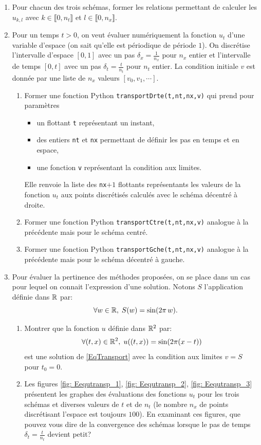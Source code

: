 \begin{enumerate}
 \item Pour chacun des trois schémas, former les relations permettant de calculer les $u_{k,l}$ avec $k\in \llbracket 0, n_t \rrbracket$ et $l\in \llbracket 0, n_x \rrbracket$.
 \item Pour un temps $t>0$, on veut évaluer numériquement la fonction $u_t$ d'une variable d'espace (on sait qu'elle est périodique de période $1$). On discrétise l'intervalle d'espace $[0,1]$ avec un pas $\delta_x = \frac{1}{n_x}$ pour $n_x$ entier et l'intervalle de temps $[0,t]$ avec un pas $\delta_t = \frac{t}{n_t}$ pour $n_t$ entier.\newline
 La condition initiale $v$ est donnée par une liste de $n_x$ valeurs $[v_0,v_1,\cdots ]$.
 \begin{enumerate}
  \item Former une fonction Python \texttt{transportDrte(t,nt,nx,v)} qui prend pour paramètres 
  \begin{itemize}
    \item un flottant \texttt{t} représentant un instant,
    \item des entiers \texttt{nt} et \texttt{nx} permettant de définir les pas en temps et en espace,
    \item une fonction \texttt{v} représentant la condition aux limites.
  \end{itemize}
Elle renvoie la liste des \texttt{nx}$+1$ flottants représentants les valeurs de la fonction $u_t$ aux points discrétisés calculés avec le schéma décentré à droite.

  \item Former une fonction Python \texttt{transportCtre(t,nt,nx,v)} analogue à la précédente mais pour le schéma centré.
  
  \item Former une fonction Python \texttt{transportGche(t,nt,nx,v)} analogue à la précédente mais pour le schéma décentré à gauche.
 \end{enumerate}
 
\item Pour évaluer la pertinence des méthodes proposées, on se place dans un cas pour lequel on connait l'expression d'une solution. Notons $S$ l'application définie dans $\mathbb{R}$ par:
\[
 \forall w\in \mathbb{R}, \; S(w) = \sin(2\pi\,w).
\]
\begin{enumerate}
 \item Montrer que la fonction $u$ définie dans $\mathbb{R}^2$ par:
\[
 \forall (t,x)\in \mathbb{R}^2, \; u((t,x)) = \sin(2\pi(x - t))
\]
est une solution de \ref{EqTransport} avec la condition aux limites $v = S$ pour $t_0=0$.
 \item Les figures \ref{fig: Eequtransp_1}, \ref{fig: Eequtransp_2}, \ref{fig: Eequtransp_3} présentent les graphes des évaluations des fonctions $u_t$ pour les trois schémas et diverses valeurs de $t$ et de $n_t$ (le nombre $n_x$ de points discrétisant l'espace est toujours $100$).\newline
 En examinant ces figures, que pouvez vous dire de la convergence des schémas lorsque le pas de temps $\delta_t = \frac{t}{n_t}$ devient petit?
\end{enumerate}


\end{enumerate}
